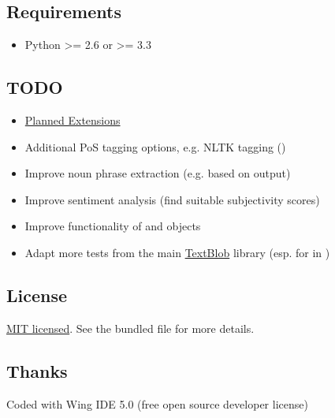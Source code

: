 \documentclass[letterpaper,10pt,english]{sphinxmanual}
\begin{document}
\subsection{Requirements}
\label{readme:requirements}\begin{itemize}
\item {} 
Python \textgreater{}= 2.6 or \textgreater{}= 3.3

\end{itemize}


\subsection{TODO}
\label{readme:todo}\begin{itemize}
\item {} 
\href{http://textblob-de.readthedocs.org/en/latest/extensions.html}{Planned Extensions}

\item {} 
Additional PoS tagging options, e.g. NLTK tagging ()

\item {} 
Improve noun phrase extraction (e.g. based on  output)

\item {} 
Improve sentiment analysis (find suitable subjectivity scores)

\item {} 
Improve functionality of  and  objects

\item {} 
Adapt more tests from the main \href{http://textblob.readthedocs.org/en/dev/}{TextBlob} library (esp. for  in )

\end{itemize}


\subsection{License}
\label{readme:license}
\href{http://choosealicense.com/licenses/mit/}{MIT licensed}. See the bundled   file for more details.


\subsection{Thanks}
\label{readme:thanks}
Coded with Wing IDE 5.0 (free open source developer license)
\href{https://wingware.com/store/free}{}
\end{document}
